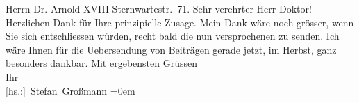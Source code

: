 \begin{ledgroupsized}[t]{13cm}
           \pstart
           \noindent{}\raggedleft{}Herrn\pend
           \pstart
           \noindent{}\raggedleft{}Dr. Arnold \pend
           \pstart
           \noindent{}\raggedleft{} XVIII\pend
           \pstart
           \noindent{}\raggedleft{}Sternwartestr. 71. \pend
           \pstart\center{}Sehr verehrter Herr Doktor!\pend\pstart
           Herzlichen Dank für Ihre prinzipielle Zusage. Mein Dank wäre noch grösser, wenn Sie
               sich entschliessen würden, recht bald die nun versprochenen \label{K_L02451-1v}\label{K_L02451-1h} zu senden. Ich wäre Ihnen für die Uebersendung von
               Beiträgen gerade jetzt, im Herbst, ganz besonders dankbar.\pend
           \pstart
           Mit ergebensten Grüssen{\\[\baselineskip]}Ihr{\\[\baselineskip]}\spacefill\mbox{{[}hs.:{]} Stefan Großmann}\pend
           \leftskip=0em{}
         
         \endnumbering{}\end{ledgroupsized}  \newcommand{\dateiname}{L02451}\newcommand{\titel}{Stefan Großmann an Arthur Schnitzler, [nach dem 25. 9. 1925]}\newcommand{\editorInnen}{ Martin Anton Müller und Gerd-Hermann Susen}
      